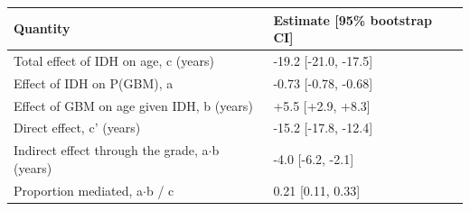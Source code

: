 \begin{tabular}{ll}
\toprule
\textbf{Quantity} & \textbf{Estimate [95\% bootstrap CI]} \\
\midrule
Total effect of IDH on age, c (years) & -19.2 [-21.0, -17.5] \\
Effect of IDH on P(GBM), a & -0.73 [-0.78, -0.68] \\
Effect of GBM on age given IDH, b (years) & +5.5 [+2.9, +8.3] \\
Direct effect, c' (years) & -15.2 [-17.8, -12.4] \\
Indirect effect through the grade, a$\cdot$b (years) & -4.0 [-6.2, -2.1] \\
Proportion mediated, a$\cdot$b / c & 0.21 [0.11, 0.33] \\
\bottomrule
\end{tabular}
